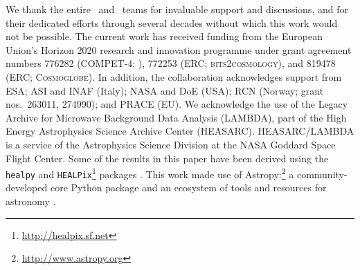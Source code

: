 \begin{acknowledgements}
  We thank the entire \Planck\ and \WMAP\ teams for
  invaluable support and discussions, and for their dedicated efforts
  through several decades without which this work would not be
  possible. The current work has received funding from the European
  Union’s Horizon 2020 research and innovation programme under grant
  agreement numbers 776282 (COMPET-4; \BP), 772253 (ERC;
  \textsc{bits2cosmology}), and 819478 (ERC; \textsc{Cosmoglobe}). In
  addition, the collaboration acknowledges support from ESA; 
  ASI and INAF (Italy); 
  NASA and DoE (USA); 
  RCN (Norway; grant nos.\ 263011, 274990); 
  and PRACE (EU).
  We acknowledge the use of the Legacy Archive for Microwave Background Data
  Analysis (LAMBDA), part of the High Energy Astrophysics Science Archive Center
  (HEASARC). HEASARC/LAMBDA is a service of the Astrophysics Science Division at
  the NASA Goddard Space Flight Center.  
  Some of the results in this paper have been derived using the \texttt{healpy}
  and \texttt{HEALPix}\footnote{\url{http://healpix.sf.net}} packages
  \citep{gorski2005, Zonca2019}.  This work made use of
  Astropy:\footnote{\url{http://www.astropy.org}} a community-developed
  core Python package and an ecosystem of tools and resources for
  astronomy \citep{astropy:2013, astropy:2018, astropy:2022}.
\end{acknowledgements}
